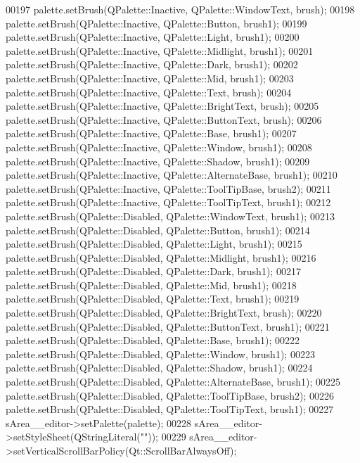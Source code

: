 \begin{DoxyCode}
00197         palette.setBrush(QPalette::Inactive, QPalette::WindowText, brush);
00198         palette.setBrush(QPalette::Inactive, QPalette::Button, brush1);
00199         palette.setBrush(QPalette::Inactive, QPalette::Light, brush1);
00200         palette.setBrush(QPalette::Inactive, QPalette::Midlight, brush1);
00201         palette.setBrush(QPalette::Inactive, QPalette::Dark, brush1);
00202         palette.setBrush(QPalette::Inactive, QPalette::Mid, brush1);
00203         palette.setBrush(QPalette::Inactive, QPalette::Text, brush);
00204         palette.setBrush(QPalette::Inactive, QPalette::BrightText, brush);
00205         palette.setBrush(QPalette::Inactive, QPalette::ButtonText, brush);
00206         palette.setBrush(QPalette::Inactive, QPalette::Base, brush1);
00207         palette.setBrush(QPalette::Inactive, QPalette::Window, brush1);
00208         palette.setBrush(QPalette::Inactive, QPalette::Shadow, brush1);
00209         palette.setBrush(QPalette::Inactive, QPalette::AlternateBase, brush1);
00210         palette.setBrush(QPalette::Inactive, QPalette::ToolTipBase, brush2);
00211         palette.setBrush(QPalette::Inactive, QPalette::ToolTipText, brush1);
00212         palette.setBrush(QPalette::Disabled, QPalette::WindowText, brush1);
00213         palette.setBrush(QPalette::Disabled, QPalette::Button, brush1);
00214         palette.setBrush(QPalette::Disabled, QPalette::Light, brush1);
00215         palette.setBrush(QPalette::Disabled, QPalette::Midlight, brush1);
00216         palette.setBrush(QPalette::Disabled, QPalette::Dark, brush1);
00217         palette.setBrush(QPalette::Disabled, QPalette::Mid, brush1);
00218         palette.setBrush(QPalette::Disabled, QPalette::Text, brush1);
00219         palette.setBrush(QPalette::Disabled, QPalette::BrightText, brush);
00220         palette.setBrush(QPalette::Disabled, QPalette::ButtonText, brush1);
00221         palette.setBrush(QPalette::Disabled, QPalette::Base, brush1);
00222         palette.setBrush(QPalette::Disabled, QPalette::Window, brush1);
00223         palette.setBrush(QPalette::Disabled, QPalette::Shadow, brush1);
00224         palette.setBrush(QPalette::Disabled, QPalette::AlternateBase, brush1);
00225         palette.setBrush(QPalette::Disabled, QPalette::ToolTipBase, brush2);
00226         palette.setBrush(QPalette::Disabled, QPalette::ToolTipText, brush1);
00227         sArea\_\_editor->setPalette(palette);
00228         sArea\_\_editor->setStyleSheet(QStringLiteral(\textcolor{stringliteral}{""}));
00229         sArea\_\_editor->setVerticalScrollBarPolicy(Qt::ScrollBarAlwaysOff);

\end{DoxyCode}
